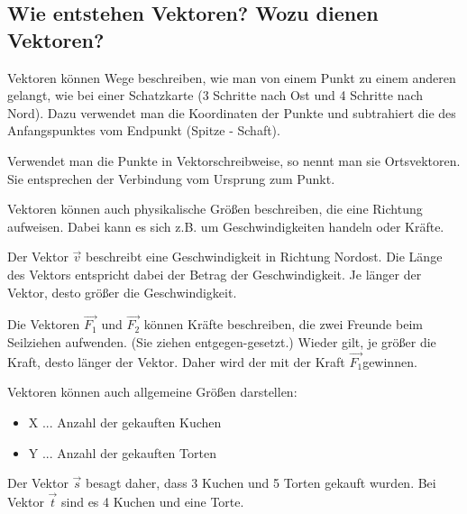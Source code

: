 \newpage
\subsection{Wie entstehen Vektoren? Wozu dienen Vektoren?}

\hfill \break
Vektoren können Wege beschreiben, wie man von einem Punkt zu einem anderen gelangt, wie bei einer Schatzkarte (3 Schritte nach Ost und 4 Schritte nach Nord).
Dazu verwendet man die Koordinaten der Punkte und subtrahiert die des Anfangspunktes vom Endpunkt (Spitze - Schaft).

\hfill \break
Verwendet man die Punkte in Vektorschreibweise, so nennt man sie Ortsvektoren.
Sie entsprechen der Verbindung vom Ursprung zum Punkt.

\hfill \break
Vektoren können auch physikalische Größen beschreiben, die eine Richtung aufweisen. Dabei kann es sich z.B. um
Geschwindigkeiten handeln oder Kräfte.

\hfill \break
Der Vektor $\vec{v}$ beschreibt eine Geschwindigkeit in Richtung Nordost.
Die Länge des Vektors entspricht dabei der Betrag der Geschwindigkeit.
Je länger der Vektor, desto größer die Geschwindigkeit.

\hfill \break
Die Vektoren $\vec{F_1}$ und $\vec{F_2}$ können Kräfte beschreiben, die zwei Freunde beim Seilziehen aufwenden.
(Sie ziehen entgegen-gesetzt.) Wieder gilt, je größer die Kraft, desto länger der Vektor.
Daher wird der mit der Kraft $\vec{F_1}$gewinnen.

\hfill \break
Vektoren können auch allgemeine Größen darstellen:\\
\begin{itemize}
    \item X ... Anzahl der gekauften Kuchen
    \item Y ... Anzahl der gekauften Torten
\end{itemize}
Der Vektor $\vec{s}$ besagt daher, dass 3 Kuchen und 5 Torten gekauft wurden.
Bei Vektor $\vec{t}$ sind es 4 Kuchen und eine Torte.